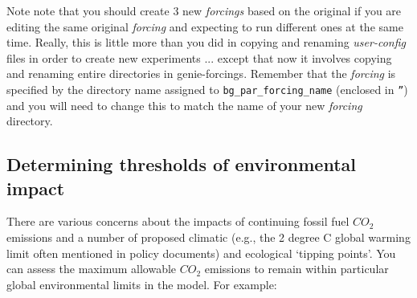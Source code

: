 \documentclass[11pt,fleqn]{book} %
\begin{document}
Note note that you should create 3 new \textit{forcings} based on the original if you are editing the same original  \textit{forcing} and expecting to run different ones at the same time. Really, this is little more than you did in copying and renaming \textit{user-config} files in order to create new experiments ... except that now it involves copying and renaming entire directories in \textsf{\footnotesize genie-forcings}. Remember that the \textit{forcing} is specified by the directory name assigned to \texttt{bg\_par\_forcing\_name} (enclosed in \texttt{''}) and you will need to change this to match the name of your new \textit{forcing} directory.


\subsection{Determining thresholds of environmental impact}

There are various concerns about the impacts of continuing fossil fuel \(CO_{2}\) emissions and a number of proposed climatic (e.g., the 2 degree C global warming limit often mentioned in policy documents) and ecological ‘tipping points’. You can assess the maximum allowable \(CO_{2}\) emissions to remain within particular global environmental limits in the model. For example:
\end{document}
